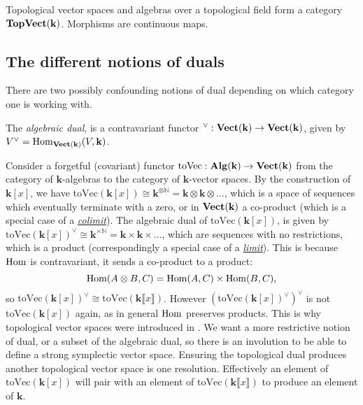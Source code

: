         Topological vector spaces and algebras over a topological field form a category \( \mathbf{TopVect}(\mathbf{k})\). Morphisms are continuous maps.
    
        \subsection{The different notions of duals}
        There are two possibly confounding notions of dual depending on which category one is working with.

        \begin{defn}
        The \emph{algebraic dual}, is a contravariant functor
        \( {}^{\vee} :  \mathbf{Vect}(\mathbf{k}) \rightarrow \mathbf{Vect}(\mathbf{k})\), given by
        \( V^{\vee} =  \mathrm{Hom}_{\mathbf{Vect}(\mathbf{k})}(V, \mathbf{k})\).
        \end{defn} 

        Consider a forgetful (covariant) functor \(\mathrm{toVec}  : \mathbf{Alg}(\mathbf{k})  \rightarrow \mathbf{Vect}(\mathbf{k})\) from the category of \(\mathbf{k}\)-algebras to the category of \( \mathbf{k}\)-vector spaces. By the construction of \( \mathbf{k}[x]\), we have  \( \mathrm{toVec}(\mathbf{k}[x]) \cong \mathbf{k}^{\otimes \mathbb{N}} = \mathbf{k} \otimes \mathbf{k} \otimes \dots  \), which is a space of sequences which eventually terminate with a zero, or in \(\mathbf{Vect}(\mathbf{k})\) a co-product (which is a special case of a \emph{\hyperref[defn:colimit]{colimit}}). The algebraic dual of \( \mathrm{toVec}(\mathbf{k}[x]) \), is given by \( \mathrm{toVec}(\mathbf{k}[x]) ^{\vee} \cong \mathbf{k}^{\times \mathbb{N}} = \mathbf{k} \times \mathbf{k} \times \dots \), which are sequences with no restrictions, which is a product (correspondingly a special case of a \emph{\hyperref[defn:limit]{limit}}). This is because \( \mathrm{Hom}\) is contravariant, it sends a co-product to a product:
        \[ \mathrm{Hom}(A \otimes B , C) =\mathrm{Hom}(A , C) \times \mathrm{Hom}(B,C),\]
        so \(\mathrm{toVec}(\mathbf{k}[x])^{\vee} \cong \mathrm{toVec}( \mathbf{k} \lBrack x \rBrack)\). However \( (\mathrm{toVec}(\mathbf{k}[x])^{\vee})^{\vee}\) is not \( \mathrm{toVec}( \mathbf{k}[x] )\) again, as in general \( \mathrm{Hom}\) preserves products. This is why topological vector spaces were introduced in \cite{ks_airy}. We want a more restrictive notion of dual, or a subset of the algebraic dual, so there is an involution to be able to define a strong symplectic vector space. Ensuring the topological dual produces another topological vector space is one resolution.
        Effectively an element of \( \mathrm{toVec}(\mathbf{k}[x])\) will pair with an element of \(\mathrm{toVec}(\mathbf{k}\lBrack x \rBrack)\) to produce an element of \( \mathbf{k}\).
    
